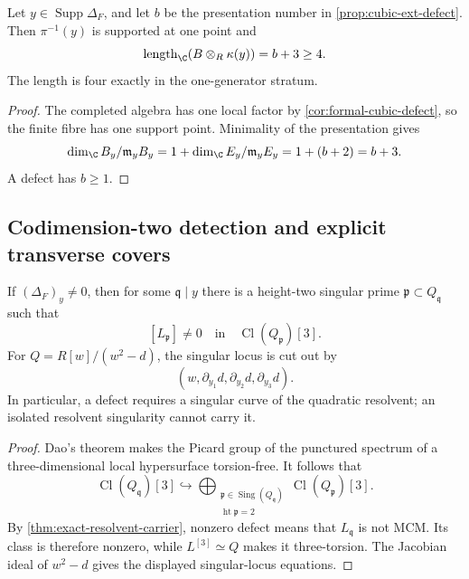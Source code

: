 \begin{corollary}
\label{cor:cubic-defect-fibre-length}
Let \(y\in\operatorname{Supp}\Delta_F\), and let \(b\) be the presentation
number in \cref{prop:cubic-ext-defect}.  Then \(\pi^{-1}(y)\) is supported at
one point and
\[
\operatorname{length}_\C(B\otimes_R\kappa(y))=b+3\ge4.
\]
The length is four exactly in the one-generator stratum.
\end{corollary}

\begin{proof}
The completed algebra has one local factor by
\cref{cor:formal-cubic-defect}, so the finite fibre has one support point.
Minimality of the presentation gives
\[
\dim_\C B_y/\mathfrak m_yB_y
 =1+\dim_\C E_y/\mathfrak m_yE_y
 =1+(b+2)=b+3.
\]
A defect has \(b\ge1\).
\end{proof}

\subsection{Codimension-two detection and explicit transverse covers}

\begin{corollary}
\label{cor:resolvent-defect-curves}
If \((\Delta_F)_y\ne0\), then for some \(\mathfrak q\mid y\) there is a
height-two singular prime \(\mathfrak p\subset Q_\mathfrak q\) such that
\[
[L_\mathfrak p]\ne0
\quad\text{in}\quad
\operatorname{Cl}(Q_\mathfrak p)[3].
\]
For \(Q=R[w]/(w^2-d)\), the singular locus is cut out by
\[
(w,\partial_{y_1}d,\partial_{y_2}d,\partial_{y_3}d).
\]
In particular, a defect requires a singular curve of the quadratic resolvent;
an isolated resolvent singularity cannot carry it.
\end{corollary}

\begin{proof}
Dao's theorem makes the Picard group of the punctured spectrum of a
three-dimensional local hypersurface torsion-free.  It follows that
\[
\operatorname{Cl}(Q_\mathfrak q)[3]\hookrightarrow
\bigoplus_{\substack{\mathfrak p\in\operatorname{Sing}(Q_\mathfrak q)\\
                     \operatorname{ht}\mathfrak p=2}}
\operatorname{Cl}(Q_\mathfrak p)[3].
\]
By \cref{thm:exact-resolvent-carrier}, nonzero defect means that
\(L_\mathfrak q\) is not MCM.  Its class is therefore nonzero, while
\(L^{[3]}\simeq Q\) makes it three-torsion.  The Jacobian ideal of
\(w^2-d\) gives the displayed singular-locus equations.
\end{proof}

